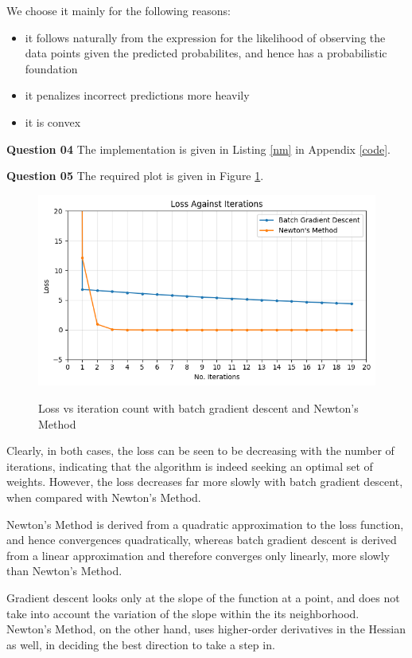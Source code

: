 \documentclass{article}[a4paper]
\begin{document}
	We choose it mainly for the following reasons:
	\begin{itemize}[noitemsep]
		\item it follows naturally from the expression for the likelihood of observing the data points given the predicted probabilites, and hence has a probabilistic foundation
		\item it penalizes incorrect predictions more heavily
		\item it is convex
	\end{itemize}
	\medskip

	\textbf{Question 04} The implementation is given in Listing \ref{nm} in Appendix \ref{code}.
	\medskip

	\textbf{Question 05} The required plot is given in Figure \ref{q3_5_1}.

	\begin{figure}[H]
		\centering
		\includegraphics[width=0.8\linewidth]{images/q3_5_1.png}
		\label{q3_5_1}
		\caption{Loss vs iteration count with batch gradient descent and Newton's Method}
	\end{figure}
	
	Clearly, in both cases, the loss can be seen to be decreasing with the number of iterations, indicating that the algorithm is indeed seeking an optimal set of weights. However, the loss decreases far more slowly with batch gradient descent, when compared with Newton's Method.

	Newton's Method is derived from a quadratic approximation to the loss function, and hence convergences quadratically, whereas batch gradient descent is derived from a linear approximation and therefore converges only linearly, more slowly than Newton's Method.

	Gradient descent looks only at the slope of the function at a point, and does not take into account the variation of the slope within the its neighborhood. Newton's Method, on the other hand, uses higher-order derivatives in the Hessian as well, in deciding the best direction to take a step in.
\end{document}
